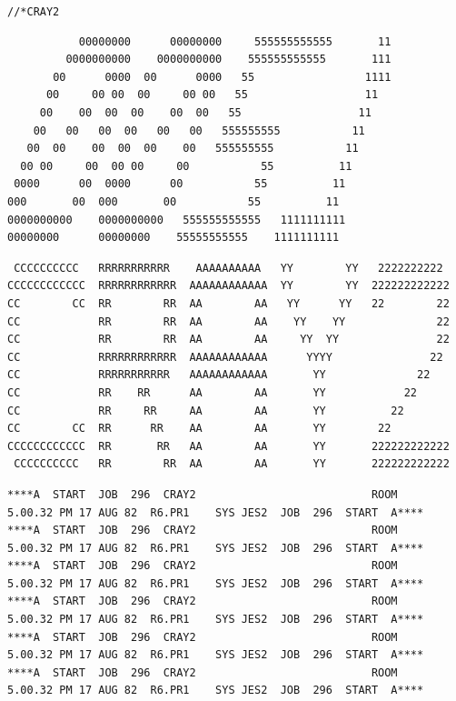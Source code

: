
\texttt{//*\quad CRAY2\qquad {}}

{\scriptsize
\begin{verbatim}
           00000000      00000000     555555555555       11
         0000000000    0000000000    555555555555       111
       00      0000  00      0000   55                 1111
      00     00 00  00     00 00   55                  11
     00    00  00  00    00  00   55                  11
    00   00   00  00   00   00   555555555           11
   00  00    00  00  00    00   555555555           11
  00 00     00  00 00     00           55          11
 0000      00  0000      00           55          11
000       00  000       00           55          11
0000000000    0000000000   555555555555   1111111111
00000000      00000000    55555555555    1111111111
\end{verbatim}
}

{\scriptsize\begin{verbatim}
 CCCCCCCCCC   RRRRRRRRRRR    AAAAAAAAAA   YY        YY   2222222222
CCCCCCCCCCCC  RRRRRRRRRRRR  AAAAAAAAAAAA  YY        YY  222222222222
CC        CC  RR        RR  AA        AA   YY      YY   22        22
CC            RR        RR  AA        AA    YY    YY              22
CC            RR        RR  AA        AA     YY  YY               22
CC            RRRRRRRRRRRR  AAAAAAAAAAAA      YYYY               22
CC            RRRRRRRRRRR   AAAAAAAAAAAA       YY              22
CC            RR    RR      AA        AA       YY            22
CC            RR     RR     AA        AA       YY          22
CC        CC  RR      RR    AA        AA       YY        22
CCCCCCCCCCCC  RR       RR   AA        AA       YY       222222222222
 CCCCCCCCCC   RR        RR  AA        AA       YY       222222222222
\end{verbatim}
}

{\fontsize{4.5}{5.9}\selectfont
\begin{verbatim}
****A  START  JOB  296  CRAY2                           ROOM        5.00.32 PM 17 AUG 82  R6.PR1    SYS JES2  JOB  296  START  A****
****A  START  JOB  296  CRAY2                           ROOM        5.00.32 PM 17 AUG 82  R6.PR1    SYS JES2  JOB  296  START  A****
****A  START  JOB  296  CRAY2                           ROOM        5.00.32 PM 17 AUG 82  R6.PR1    SYS JES2  JOB  296  START  A****
****A  START  JOB  296  CRAY2                           ROOM        5.00.32 PM 17 AUG 82  R6.PR1    SYS JES2  JOB  296  START  A****
****A  START  JOB  296  CRAY2                           ROOM        5.00.32 PM 17 AUG 82  R6.PR1    SYS JES2  JOB  296  START  A****
****A  START  JOB  296  CRAY2                           ROOM        5.00.32 PM 17 AUG 82  R6.PR1    SYS JES2  JOB  296  START  A****
\end{verbatim}
}

